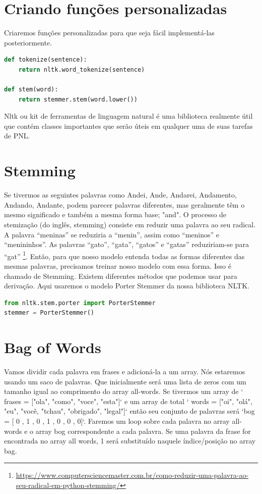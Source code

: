 \section[Criando funções personalizadas]{Criando funções personalizadas}
Criaremos funções personalizadas para que seja fácil implementá-las posteriormente.
\justifying
\begin{lstlisting}[language=Python, caption=Python Funções personalizadas]
def tokenize(sentence):
    return nltk.word_tokenize(sentence)

def stem(word):
    return stemmer.stem(word.lower())

\end{lstlisting}
Nltk ou kit de ferramentas de linguagem natural é uma biblioteca realmente útil que contém classes importantes que serão úteis em qualquer uma de suas tarefas de PNL.
\justifying
\section[Stemming]{Stemming}


Se tivermos as seguintes palavras como Andei, Ande, Andarei, Andamento, Andando, Andante, podem parecer palavras diferentes, mas geralmente têm o mesmo significado e também a mesma forma base; "and".
O processo de stemização (do inglês, stemming) consiste em reduzir uma palavra ao seu radical. A palavra “meninas” se reduziria a “menin”, assim como “meninos” e “menininhos”. As palavras “gato”, “gata”, “gatos” e “gatas” reduziriam-se para “gat” \footnote{\url{https://www.computersciencemaster.com.br/como-reduzir-uma-palavra-ao-seu-radical-em-python-stemming/}}.
Então, para que nosso modelo entenda todas as formas diferentes das mesmas palavras, precisamos treinar nosso modelo com essa forma. Isso é chamado de Stemming. Existem diferentes métodos que podemos usar para derivação. Aqui usaremos o modelo Porter Stemmer da nossa biblioteca NLTK.
\justifying
\begin{lstlisting}[language=Python, caption=Python Stemming]
from nltk.stem.porter import PorterStemmer
stemmer = PorterStemmer()
\end{lstlisting}

\section[Bag of Words]{Bag of Words}
Vamos dividir cada palavra em frases e adicioná-la a um array. Nós estaremos usando um saco de palavras. Que inicialmente será uma lista de zeros com um tamanho igual ao comprimento do array all-words. Se tivermos um array de ` frases = ["ola", "como", "voce", "esta"]` e um array de total ` words = ["oi", "olá", "eu", "você, "tchau", "obrigado", "legal"]` então seu conjunto de palavras será `bog = [ 0 , 1 , 0 , 1 , 0 , 0 , 0]`. Faremos um loop sobre cada palavra no array all-words e o array bog correspondente a cada palavra. Se uma palavra da frase for encontrada no array all words, 1 será substituído naquele índice/posição no array bag.
\justifying


